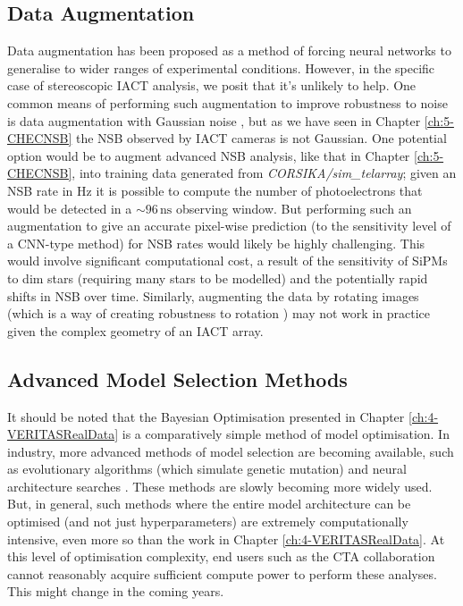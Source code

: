 \subsection{Data Augmentation}
Data augmentation has been proposed \cite{aug} as a method of forcing neural networks to generalise to wider ranges of experimental conditions. However, in the specific case of stereoscopic IACT analysis, we posit that it's unlikely to help. One common means of performing such augmentation to improve robustness to noise is data augmentation with Gaussian noise \cite{bayesdeblend}, but as we have seen in Chapter \ref{ch:5-CHECNSB} the NSB observed by IACT cameras is not Gaussian. One potential option would be to augment advanced NSB analysis, like that in Chapter \ref{ch:5-CHECNSB}, into training data generated from \textit{CORSIKA/sim\_telarray}; given an NSB rate in Hz it is possible to compute the number of photoelectrons that would be detected in a $\mathrm{\sim 96\,ns}$ observing window. But performing such an augmentation to give an accurate pixel-wise prediction (to the sensitivity level of a CNN-type method) for NSB rates would likely be highly challenging. This would involve significant computational cost, a result of the sensitivity of SiPMs to dim stars (requiring many stars to be modelled) and the potentially rapid shifts in NSB over time. Similarly, augmenting the data by rotating images (which is a way of creating robustness to rotation \cite{Keras}) may not work in practice given the complex geometry of an IACT array.

\subsection{Advanced Model Selection Methods}

It should be noted that the Bayesian Optimisation presented in Chapter \ref{ch:4-VERITASRealData} is a comparatively simple method of model optimisation. In industry, more advanced methods of model selection are becoming available, such as evolutionary algorithms \cite{evodeep} (which simulate genetic mutation) and neural architecture searches \cite{neural}. These methods are slowly becoming more widely used. But, in general, such methods where the entire model architecture can be optimised (and not just hyperparameters) are extremely computationally intensive, even more so than the work in Chapter \ref{ch:4-VERITASRealData}. At this level of optimisation complexity, end users such as the CTA collaboration cannot reasonably acquire sufficient compute power to perform these analyses. This might change in the coming years.

